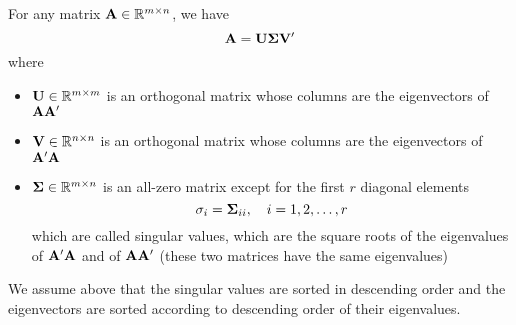 \begin{definition}
	For any matrix \(\mathbf{A}\in\mathbb{R}^{m\times n}\), we have
	\begin{equation}
		\mathbf{A}=\mathbf{U}\boldsymbol{\Sigma}\mathbf{V}^{\prime}
	\end{equation}
	where
	\begin{itemize}
		\item \(\mathbf{U}\in\mathbb{R}^{m\times m}\) is an orthogonal matrix whose columns are the eigenvectors of \(\mathbf{A}\mathbf{A}^{\prime}\)
		\item \(\mathbf{V}\in\mathbb{R}^{n\times n}\) is an orthogonal matrix whose columns are the eigenvectors of \(\mathbf{A}^{\prime}\mathbf{A}\)
		\item \(\boldsymbol{\Sigma}\in\mathbb{R}^{m\times n}\) is an all-zero matrix except for the first \(r\) diagonal elements
		      \begin{equation*}
			      \sigma_{i}=\boldsymbol{\Sigma}_{ii},\quad i=1,2,\ldots,r
		      \end{equation*}
		      which are called singular values, which are the square roots of the eigenvalues of \(\mathbf{A}^{\prime}\mathbf{A}\) and of \(\mathbf{A}\mathbf{A}^{\prime}\) (these two matrices have the same eigenvalues)
	\end{itemize}
\end{definition}

\begin{remark}
	We assume above that the singular values are sorted in descending order and the eigenvectors are sorted according to descending order of their eigenvalues.
\end{remark}

